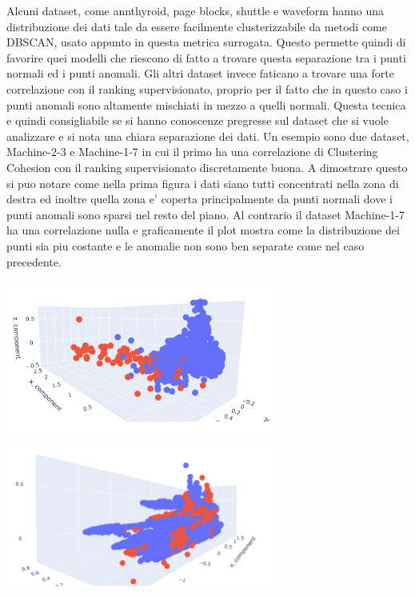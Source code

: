 Alcuni dataset, come annthyroid, page blocks, shuttle e waveform hanno una distribuzione dei dati tale da essere facilmente clusterizzabile da metodi come DBSCAN, usato appunto in questa metrica surrogata. Questo permette quindi di favorire quei modelli che riescono di fatto a trovare questa separazione tra i punti normali ed i punti anomali.
Gli altri dataset invece faticano a trovare una forte correlazione con il ranking supervisionato, proprio per il fatto che in questo caso i punti anomali sono altamente mischiati in mezzo a quelli normali.
Questa tecnica e quindi consigliabile se si hanno conoscenze pregresse sul dataset che si vuole analizzare e si nota una chiara separazione dei dati. Un esempio sono due dataset, Machine-2-3 e Machine-1-7 in cui il primo ha una correlazione di Clustering Cohesion con il ranking supervisionato discretamente buona. A dimostrare questo si puo notare come nella prima figura i dati siano tutti concentrati nella zona di destra ed inoltre quella zona e' coperta principalmente da punti normali dove i punti anomali sono sparsi nel resto del piano. 
Al contrario il dataset Machine-1-7 ha una correlazione nulla e graficamente il plot mostra come la distribuzione dei punti sia piu costante e le anomalie non sono ben separate come nel caso precedente. 
\begin{center}
  \includegraphics[width=9cm, scale=1]{images/scatter_cluster_good}
\end{center}
\begin{center}
  \includegraphics[width=9cm, scale=1]{images/scatter_cluster}
\end{center}

